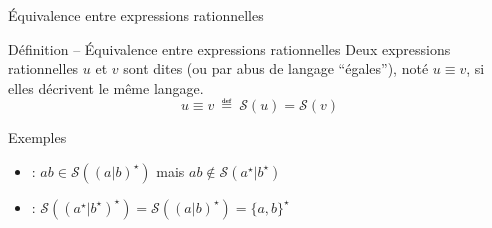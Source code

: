
\begingroup


\begin{frame}{Équivalence entre expressions rationnelles}

  \begin{block}{Définition -- Équivalence entre expressions rationnelles}
    Deux expressions rationnelles \alert{$u$} et \alert{$v$} sont dites 
    (ou par abus de langage ``égales''), noté \alert{$u \equiv v$},
    si elles décrivent le même langage.
    \alert{$$u \equiv v ~\eqdef~ \mathcal{S}(u) = \mathcal{S}(v)$$}
  \end{block}

  \begin{exampleblock}{Exemples}
    \begin{itemize}
    \item {} : $ab \in \mathcal{S}((a|b)^\star)$ mais $ab \not\in \mathcal{S}(a^\star | b^\star)$
    \item {} : $\mathcal{S}((a^\star | b^\star)^\star) = \mathcal{S}((a|b)^\star) = \{a, b\}^\star$
    \end{itemize}
  \end{exampleblock}
  
  
\end{frame}

\endgroup
